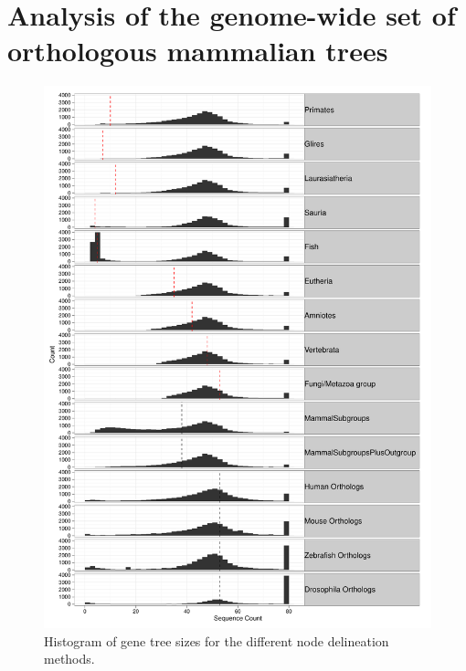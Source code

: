 \section{Analysis of the genome-wide set of orthologous mammalian trees}

\begin{figure}[t]
\begin{center}
\includegraphics[scale=0.6]{Figs/Mammals1_Fig1.pdf}
\end{center}
\caption{Histogram of gene tree sizes for the different node delineation methods. }
\label{mammals1_fig1}
\end{figure}

